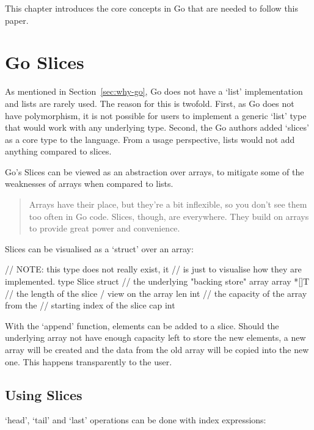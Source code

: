This chapter introduces the core concepts in Go that are needed to follow this paper.

\section{Go Slices}\label{sec:go-slices}

As mentioned in Section~\ref{sec:why-go}, Go does not have a `list' implementation and lists are rarely used.
The reason for this
is twofold. First, as Go does not have polymorphism, it is not possible for users to implement a generic
`list' type that would work with any underlying type. Second, the Go authors added `slices' as a core type
to the language. From a usage perspective, lists would not add anything compared to slices.

Go's Slices can be viewed as an abstraction over arrays, to mitigate some of the weaknesses of arrays
when compared to lists.

\begin{quote}
    Arrays have their place, but they're a bit inflexible, so you don't see them too often in Go code.
    Slices, though, are everywhere. They build on arrays to provide great power and convenience.\autocite{golang-slices}
\end{quote}

Slices can be visualised as a `struct' over an array:

\begin{gocode}
// NOTE: this type does not really exist, it
// is just to visualise how they are implemented.
type Slice struct {
    // the underlying "backing store" array
    array *[]T
    // the length of the slice / view on the array
    len int
    // the capacity of the array from the
    // starting index of the slice
    cap int
}
\end{gocode}

With the `append' function, elements can be added to a slice. Should the underlying array not have enough
capacity left to store the new elements, a new array will be created and the data from the old array will
be copied into the new one. This happens transparently to the user.

\subsection{Using Slices}

`head', `tail' and `last' operations can be done with index expressions:

